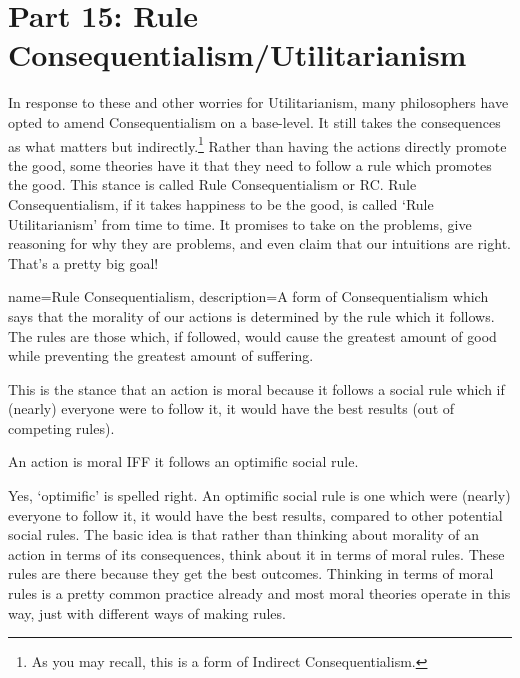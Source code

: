 \chapter{Part 15: Rule Consequentialism/Utilitarianism}
In response to these and other worries for Utilitarianism, many philosophers have opted to amend Consequentialism on a base-level. It still takes the consequences as what matters but indirectly.\footnote{As you may recall, this is a form of Indirect Consequentialism.} Rather than having the actions directly promote the good, some theories have it that they need to follow a rule which promotes the good. This stance is called Rule Consequentialism or RC. \gls{Rule Consequentialism}, if it takes happiness to be the good, is called ‘Rule Utilitarianism’ from time to time. It promises to take on the problems, give reasoning for why they are problems, and even claim that our intuitions are right. That’s a pretty big goal!

{
  name=Rule Consequentialism,
  description={A form of Consequentialism which says that the morality of our actions is determined by the rule which it follows. The rules are those which, if followed, would cause the greatest amount of good while preventing the greatest amount of suffering.}
}


This is the stance that an action is moral because it follows a social rule which if (nearly) everyone were to follow it, it would have the best results (out of competing rules).
\begin{center}
An action is moral IFF it follows an optimific social rule.
\end{center}
Yes, ‘optimific’ is spelled right. An optimific social rule is one which were (nearly) everyone to follow it, it would have the best results, compared to other potential social rules. The basic idea is that rather than thinking about morality of an action in terms of its consequences, think about it in terms of moral rules. These rules are there because they get the best outcomes. Thinking in terms of moral rules is a pretty common practice already and most moral theories operate in this way, just with different ways of making rules.

